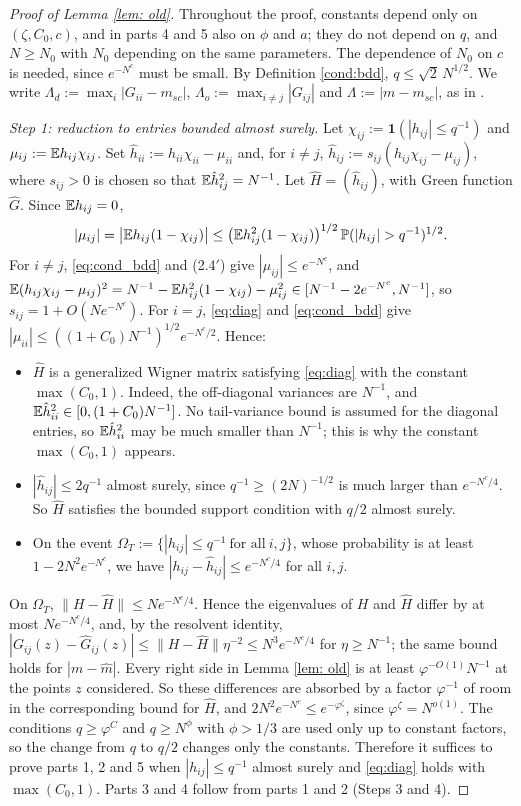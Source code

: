 \begin{proof}[Proof of Lemma \ref{lem: old}] Throughout the proof, constants depend only on $(\zeta,C_0,c)$, and in parts 4 and 5 also on $\phi$ and $a$; they do not depend on $q$, and $N\ge N_0$ with $N_0$ depending on the same parameters. The dependence of $N_0$ on $c$ is needed, since $e^{-N^c}$ must be small. By Definition \ref{cond:bdd}, $q\le\sqrt2\,N^{1/2}$. We write $\Lambda_d:=\max_i|G_{ii}-m_{sc}|$, $\Lambda_o:=\max_{i\ne j}|G_{ij}|$ and $\Lambda:=|m-m_{sc}|$, as in \cite{EKYY1}.

{\it Step 1: reduction to entries bounded almost surely.} Let $\chi_{ij}:=\mathbf 1(|h_{ij}|\le q^{-1})$ and $\mu_{ij}:=\mathbb{E} h_{ij}\chi_{ij}$. Set $\hat h_{ii}:=h_{ii}\chi_{ii}-\mu_{ii}$ and, for $i\ne j$, $\hat h_{ij}:=s_{ij}(h_{ij}\chi_{ij}-\mu_{ij})$, where $s_{ij}>0$ is chosen so that $\mathbb{E}\hat h_{ij}^2=N^{-1}$. Let $\hat H=(\hat h_{ij})$, with Green function $\hat G$. Since $\mathbb{E} h_{ij}=0$,
$$
|\mu_{ij}|=\big|\E h_{ij}(1-\chi_{ij})\big|\le\big(\E h_{ij}^2(1-\chi_{ij})\big)^{1/2}\,\p(|h_{ij}|>q^{-1})^{1/2}.
$$
For $i\ne j$, \eqref{eq:cond_bdd} and (2.4$'$) give $|\mu_{ij}|\le e^{-N^c}$, and $\mathbb{E}(h_{ij}\chi_{ij}-\mu_{ij})^2=N^{-1}-\mathbb{E} h_{ij}^2(1-\chi_{ij})-\mu_{ij}^2\in[N^{-1}-2e^{-N^c},N^{-1}]$, so $s_{ij}=1+O(Ne^{-N^c})$. For $i=j$, \eqref{eq:diag} and \eqref{eq:cond_bdd} give $|\mu_{ii}|\le((1+C_0)N^{-1})^{1/2}e^{-N^c/2}$. Hence:
\begin{itemize}
\item $\hat H$ is a generalized Wigner matrix satisfying \eqref{eq:diag} with the constant $\max(C_0,1)$. Indeed, the off-diagonal variances are $N^{-1}$, and $\mathbb{E}\hat h_{ii}^2\in[0,(1+C_0)N^{-1}]$. No tail-variance bound is assumed for the diagonal entries, so $\mathbb{E}\hat h_{ii}^2$ may be much smaller than $N^{-1}$; this is why the constant $\max(C_0,1)$ appears.
\item $|\hat h_{ij}|\le2q^{-1}$ almost surely, since $q^{-1}\ge(2N)^{-1/2}$ is much larger than $e^{-N^c/4}$. So $\hat H$ satisfies the bounded support condition with $q/2$ almost surely.
\item On the event $\Omega_T:=\{|h_{ij}|\le q^{-1}\ \text{for all}\ i,j\}$, whose probability is at least $1-2N^2e^{-N^c}$, we have $|h_{ij}-\hat h_{ij}|\le e^{-N^c/4}$ for all $i,j$.
\end{itemize}
On $\Omega_T$, $\|H-\hat H\|\le Ne^{-N^c/4}$. Hence the eigenvalues of $H$ and $\hat H$ differ by at most $Ne^{-N^c/4}$, and, by the resolvent identity, $|G_{ij}(z)-\hat G_{ij}(z)|\le\|H-\hat H\|\eta^{-2}\le N^3e^{-N^c/4}$ for $\eta\ge N^{-1}$; the same bound holds for $|m-\hat m|$. Every right side in Lemma \ref{lem: old} is at least $\varphi^{-O(1)}N^{-1}$ at the points $z$ considered. So these differences are absorbed by a factor $\varphi^{-1}$ of room in the corresponding bound for $\hat H$, and $2N^2e^{-N^c}\le e^{-\varphi^\zeta}$, since $\varphi^\zeta=N^{o(1)}$. The conditions $q\ge\varphi^C$ and $q\ge N^\phi$ with $\phi>1/3$ are used only up to constant factors, so the change from $q$ to $q/2$ changes only the constants. Therefore it suffices to prove parts 1, 2 and 5 when $|h_{ij}|\le q^{-1}$ almost surely and \eqref{eq:diag} holds with $\max(C_0,1)$. Parts 3 and 4 follow from parts 1 and 2 (Steps 3 and 4).


\end{proof}
